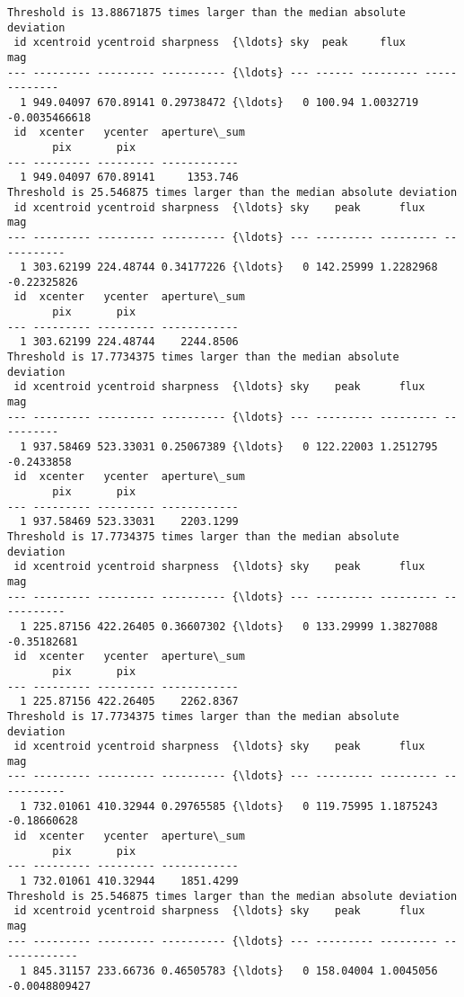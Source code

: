 \documentclass[11pt]{article}
\begin{document}
    \begin{Verbatim}[commandchars=\\\{\}]
Threshold is 13.88671875 times larger than the median absolute deviation
 id xcentroid ycentroid sharpness  {\ldots} sky  peak     flux        mag
--- --------- --------- ---------- {\ldots} --- ------ --------- -------------
  1 949.04097 670.89141 0.29738472 {\ldots}   0 100.94 1.0032719 -0.0035466618
 id  xcenter   ycenter  aperture\_sum
       pix       pix
--- --------- --------- ------------
  1 949.04097 670.89141     1353.746
Threshold is 25.546875 times larger than the median absolute deviation
 id xcentroid ycentroid sharpness  {\ldots} sky    peak      flux       mag
--- --------- --------- ---------- {\ldots} --- --------- --------- -----------
  1 303.62199 224.48744 0.34177226 {\ldots}   0 142.25999 1.2282968 -0.22325826
 id  xcenter   ycenter  aperture\_sum
       pix       pix
--- --------- --------- ------------
  1 303.62199 224.48744    2244.8506
Threshold is 17.7734375 times larger than the median absolute deviation
 id xcentroid ycentroid sharpness  {\ldots} sky    peak      flux      mag
--- --------- --------- ---------- {\ldots} --- --------- --------- ----------
  1 937.58469 523.33031 0.25067389 {\ldots}   0 122.22003 1.2512795 -0.2433858
 id  xcenter   ycenter  aperture\_sum
       pix       pix
--- --------- --------- ------------
  1 937.58469 523.33031    2203.1299
Threshold is 17.7734375 times larger than the median absolute deviation
 id xcentroid ycentroid sharpness  {\ldots} sky    peak      flux       mag
--- --------- --------- ---------- {\ldots} --- --------- --------- -----------
  1 225.87156 422.26405 0.36607302 {\ldots}   0 133.29999 1.3827088 -0.35182681
 id  xcenter   ycenter  aperture\_sum
       pix       pix
--- --------- --------- ------------
  1 225.87156 422.26405    2262.8367
Threshold is 17.7734375 times larger than the median absolute deviation
 id xcentroid ycentroid sharpness  {\ldots} sky    peak      flux       mag
--- --------- --------- ---------- {\ldots} --- --------- --------- -----------
  1 732.01061 410.32944 0.29765585 {\ldots}   0 119.75995 1.1875243 -0.18660628
 id  xcenter   ycenter  aperture\_sum
       pix       pix
--- --------- --------- ------------
  1 732.01061 410.32944    1851.4299
Threshold is 25.546875 times larger than the median absolute deviation
 id xcentroid ycentroid sharpness  {\ldots} sky    peak      flux        mag
--- --------- --------- ---------- {\ldots} --- --------- --------- -------------
  1 845.31157 233.66736 0.46505783 {\ldots}   0 158.04004 1.0045056 -0.0048809427

\end{Verbatim}
\end{document}
